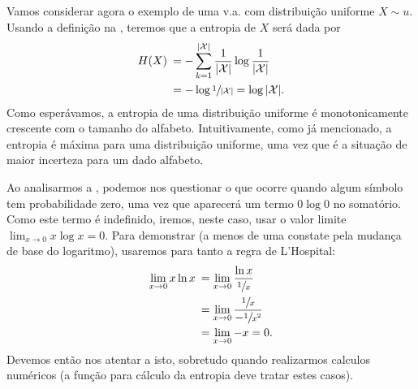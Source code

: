 \begin{example}
Vamos considerar agora o exemplo de uma v.a. com distribuição uniforme $X \sim u$.
Usando a definição na , teremos que a entropia de $X$ será dada por
\begin{subequations}\label{eq:entropy-uniform}
\begin{align}
    H(X) \: &= - \sum_{k=1}^{\vert \mathcal{X} \vert} \frac{1}{\vert \mathcal{X} \vert} \log \frac{1}{\vert \mathcal{X} \vert} \\
            &= - \log \sfrac{1}{\vert \mathcal{X} \vert} = \log \vert \mathcal{X} \vert .
\end{align}
\end{subequations}
Como esperávamos, a entropia de uma distribuição uniforme é monotonicamente
crescente com o tamanho do alfabeto. Intuitivamente, como já mencionado,
a entropia é máxima para uma distribuição uniforme, uma vez que é a situação
de maior incerteza para um dado alfabeto.
\end{example}

Ao analisarmos a , podemos nos questionar o que ocorre
quando algum símbolo tem probabilidade zero, uma vez que aparecerá um termo
$0 \log 0$ no somatório. Como este termo é indefinido, iremos, neste caso,
usar o valor limite $\lim_{x \rightarrow 0} x \log x = 0$.
Para demonstrar (a menos de uma constate pela mudança de base do logaritmo), 
usaremos para tanto a regra de L'Hospital:
\begin{subequations}\label{eq:0log0}
\begin{align}
    \lim_{x \rightarrow 0} x \ln x \: &= \lim_{x \rightarrow 0} \frac{\ln x}{\sfrac{1}{x}} \\
				    &= \lim_{x \rightarrow 0} \frac{\sfrac{1}{x}}{-\sfrac{1}{x^2}} \\
				    &= \lim_{x \rightarrow 0} -x = 0.
\end{align}
\end{subequations}
Devemos então nos atentar a isto, sobretudo quando realizarmos calculos numéricos
(a função para cálculo da entropia deve tratar estes casos).

